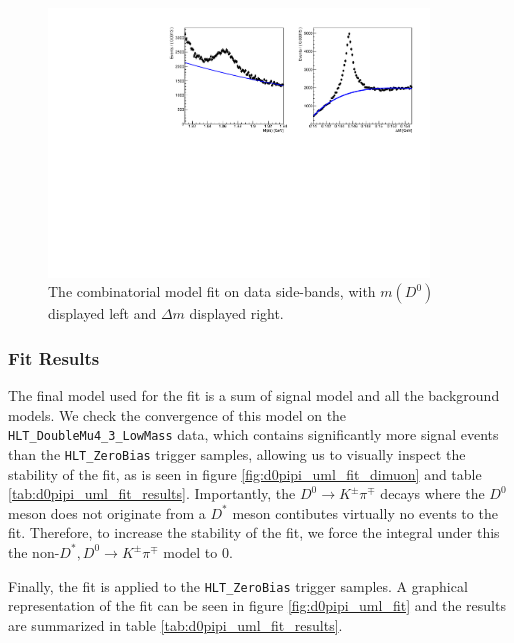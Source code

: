 \begin{figure}[htp]
    \begin{center}
      \includegraphics[width=0.9\textwidth]{figures/chapter4/normalization_fit/dpipi_fit_comb.pdf}
    \end{center}
    \caption{
      The combinatorial model fit on data side-bands, with $m(D^0)$ displayed left and $\Delta m$ displayed right.
    }
    \label{fig:d0pipi_uml_fit_comb_model}
\end{figure}

\subsubsection{Fit Results}

The final model used for the fit is a sum of signal model and all the background models. We check the convergence of this model on the \texttt{HLT\_DoubleMu4\_3\_LowMass} data, which contains significantly more signal events than the \texttt{HLT\_ZeroBias} trigger samples, allowing us to visually inspect the stability of the fit, as is seen in figure \ref{fig:d0pipi_uml_fit_dimuon} and table \ref{tab:d0pipi_uml_fit_results}. Importantly, the $D^0 \to K^\pm \pi^\mp$ decays where the $D^0$ meson does not originate from a $D^*$ meson contibutes virtually no events to the fit. Therefore, to increase the stability of the fit, we force the integral under this the non-$D^*,D^0 \to K^\pm \pi^\mp$ model to 0. 

Finally, the fit is applied to the \texttt{HLT\_ZeroBias} trigger samples. A graphical representation of the fit can be seen in figure \ref{fig:d0pipi_uml_fit} and the results are summarized in table \ref{tab:d0pipi_uml_fit_results}.


